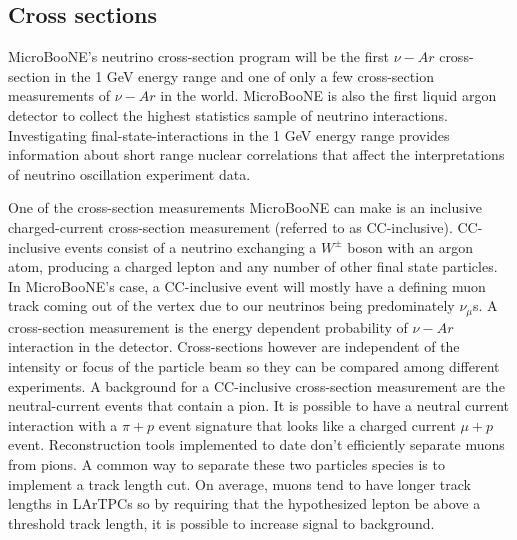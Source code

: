 \subsection{Cross sections}
MicroBooNE's neutrino cross-section program will be the first $\nu-Ar$ cross-section in the 1 GeV energy range and one of only a few cross-section measurements of $\nu-Ar$ in the world. MicroBooNE is also the first liquid argon detector to collect the highest statistics sample of neutrino interactions. Investigating final-state-interactions in the 1 GeV energy range provides information about short range nuclear correlations that affect the interpretations of neutrino oscillation experiment data. 

One of the cross-section measurements MicroBooNE can make is an inclusive charged-current cross-section measurement (referred to as CC-inclusive). CC-inclusive events consist of a neutrino exchanging a $W^{\pm}$ boson with an argon atom, producing a charged lepton and any number of other final state particles. In MicroBooNE's case, a CC-inclusive event will mostly have a defining muon track coming out of the vertex due to our neutrinos being predominately $\nu_{\mu}$s. A cross-section measurement is the energy dependent probability of $\nu-Ar$ interaction in the detector. Cross-sections however are independent of the intensity or focus of the particle beam so they can be compared among different experiments. A background for a CC-inclusive cross-section measurement are the neutral-current events that contain a pion. It is possible to have a neutral current interaction with a $\pi+p$ event signature that looks like a charged current $\mu+p$ event. Reconstruction tools implemented to date don't efficiently separate muons from pions. A common way to separate these two particles species is to implement a track length cut. On average, muons tend to have longer track lengths in LArTPCs so by requiring that the hypothesized lepton be above a threshold track length, it is possible to increase signal to background.

